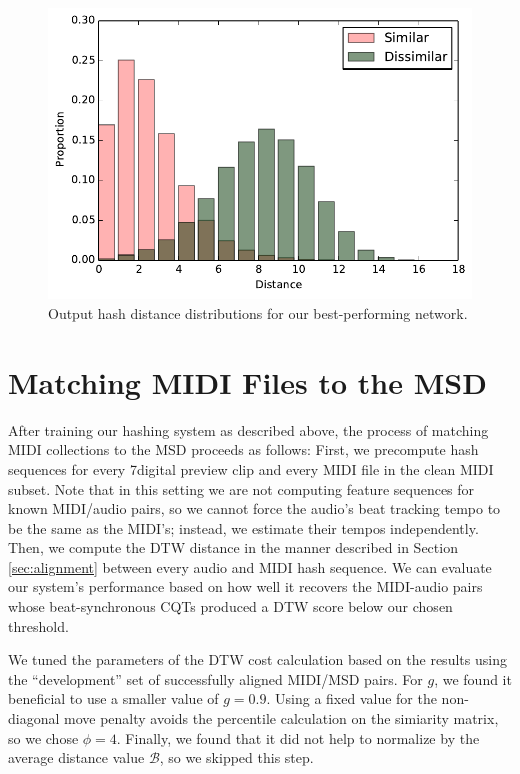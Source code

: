 \documentclass{article}
\begin{document}
\begin{figure}
  \includegraphics[width=\columnwidth]{hash_distributions.pdf}
  \caption{Output hash distance distributions for our best-performing network.}
  \label{fig:distances}
\end{figure}

\section{Matching MIDI Files to the MSD}
\label{sec:msd}

After training our hashing system as described above, the process of matching MIDI collections to the MSD proceeds as follows:
First, we precompute hash sequences for every 7digital preview clip and every MIDI file in the clean MIDI subset.
Note that in this setting we are not computing feature sequences for known MIDI/audio pairs, so we cannot force the audio's beat tracking tempo to be the same as the MIDI's; instead, we estimate their tempos independently.
Then, we compute the DTW distance in the manner described in Section \ref{sec:alignment} between every audio and MIDI hash sequence.
We can evaluate our system's performance based on how well it recovers the MIDI-audio pairs whose beat-synchronous CQTs produced a DTW score below our chosen threshold.

We tuned the parameters of the DTW cost calculation based on the results using the ``development'' set of successfully aligned MIDI/MSD pairs.
For $g$, we found it beneficial to use a smaller value of $g = 0.9$.
Using a fixed value for the non-diagonal move penalty avoids the percentile calculation on the simiarity matrix, so we chose $\phi = 4$.
Finally, we found that it did not help to normalize by the average distance value $\mathcal{B}$, so we skipped this step.
\end{document}
